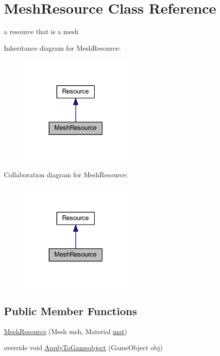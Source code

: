 \hypertarget{class_mesh_resource}{}\section{Mesh\+Resource Class Reference}
\label{class_mesh_resource}


a resource that is a mesh  




Inheritance diagram for Mesh\+Resource\+:
\nopagebreak
\begin{figure}[H]
\begin{center}
\leavevmode
\includegraphics[width=162pt]{class_mesh_resource__inherit__graph}
\end{center}
\end{figure}


Collaboration diagram for Mesh\+Resource\+:
\nopagebreak
\begin{figure}[H]
\begin{center}
\leavevmode
\includegraphics[width=162pt]{class_mesh_resource__coll__graph}
\end{center}
\end{figure}
\subsection*{Public Member Functions}
\begin{DoxyCompactItemize}
\item 
\mbox{\hyperlink{class_mesh_resource_a6ae6a4eb435fde7c0b67b65eda036a1a}{Mesh\+Resource}} (Mesh msh, Material \mbox{\hyperlink{class_mesh_resource_adfdc1e465f534b5e74a33d6880460e35}{mat}})
\item 
override void \mbox{\hyperlink{class_mesh_resource_af15a1d1060432e07a256bd3fa54d9b1c}{Apply\+To\+Gameobject}} (Game\+Object obj)
\end{DoxyCompactItemize}
